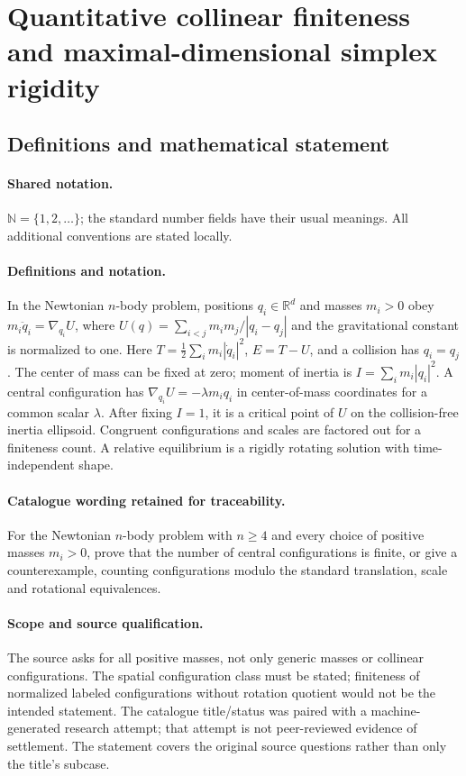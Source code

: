 \documentclass[11pt]{article}
\begin{document}
\section{Quantitative collinear finiteness and maximal-dimensional simplex rigidity}\label{statement}

\subsection{Definitions and mathematical statement}

\paragraph{Shared notation.}$\mathbb N=\{1,2,\ldots\}$; the standard number fields have their usual meanings. All additional conventions are stated locally.


\paragraph{Definitions and notation.}In the Newtonian $n$-body problem, positions $q_i\in\mathbb R^d$ and masses $m_i>0$ obey $m_i\ddot q_i=\nabla_{q_i}U$, where $U(q)=\sum_{i<j}m_im_j/|q_i-q_j|$ and the gravitational constant is normalized to one. Here $T=\tfrac12\sum_i m_i|\dot q_i|^2$, $E=T-U$, and a collision has $q_i=q_j$. The center of mass can be fixed at zero; moment of inertia is $I=\sum_i m_i|q_i|^2$. A central configuration has $\nabla_{q_i}U=-\lambda m_iq_i$ in center-of-mass coordinates for a common scalar $\lambda$. After fixing $I=1$, it is a critical point of $U$ on the collision-free inertia ellipsoid. Congruent configurations and scales are factored out for a finiteness count. A relative equilibrium is a rigidly rotating solution with time-independent shape. 

\paragraph{Catalogue wording retained for traceability.}
For the Newtonian $n$-body problem with $n\ge4$ and every choice of positive masses $m_i>0$, prove that the number of central configurations is finite, or give a counterexample, counting configurations modulo the standard translation, scale and rotational equivalences.
\paragraph{Scope and source qualification.}The source asks for all positive masses, not only generic masses or collinear configurations. The spatial configuration class must be stated; finiteness of normalized labeled configurations without rotation quotient would not be the intended statement. The catalogue title/status was paired with a machine-generated research attempt; that attempt is not peer-reviewed evidence of settlement. The statement covers the original source questions rather than only the title’s subcase.
\end{document}
